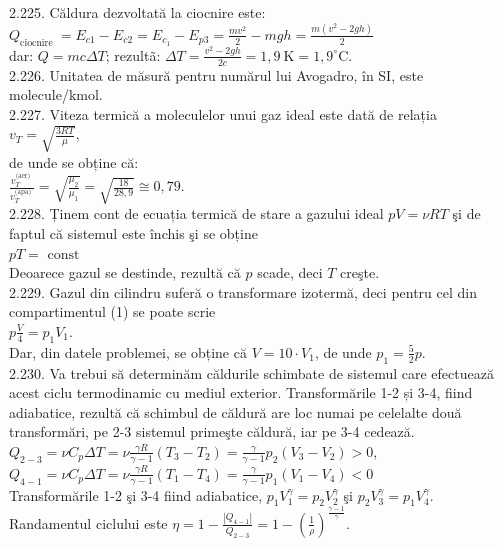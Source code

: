 2.225. Căldura dezvoltată la ciocnire este:\\ $Q_{\text {ciocnire }}=E_{c 1}-E_{c 2}=E_{c_{1}}-E_{p 3}=\frac{m v^{2}}{2}-m g h=\frac{m\left(v^{2}-2 g h\right)}{2}$\\ dar: $Q=m c \Delta T$; rezultã: $\Delta T=\frac{v^{2}-2 g h}{2 c}=1,9 \mathrm{~K}=1,9^{\circ} \mathrm{C}$.\\

2.226. Unitatea de măsură pentru numărul lui Avogadro, în SI, este molecule/kmol.\\

2.227. Viteza termică a moleculelor unui gaz ideal este dată de relația\\ $v_{T}=\sqrt{\frac{3 R T}{\mu}}$,\\ de unde se obține că:\\ $\frac{v_{T}^{\text {(aer) }}}{v_{T}^{\text {(apa) }}}=\sqrt{\frac{\mu_{2}}{\mu_{1}}}=\sqrt{\frac{18}{28,9}} \cong 0,79 .$\\

2.228. Ținem cont de ecuația termică de stare a gazului ideal $p V=\nu R T$ şi de faptul că sistemul este închis şi se obține\\ $p T=\text { const }$\\ Deoarece gazul se destinde, rezultă că $p$ scade, deci $T$ creşte.\\

2.229. Gazul din cilindru suferă o transformare izotermă, deci pentru cel din compartimentul (1) se poate scrie\\ $p \frac{V}{4}=p_{1} V_{1}$.\\

Dar, din datele problemei, se obține că $V=10 \cdot V_{1}$, de unde $p_{1}=\frac{5}{2} p$.\\

2.230. Va trebui să determinăm căldurile schimbate de sistemul care efectuează acest ciclu termodinamic cu mediul exterior. Transformările 1-2 și 3-4, fiind adiabatice, rezultă că schimbul de căldură are loc numai pe celelalte două transformări, pe 2-3 sistemul primeşte căldură, iar pe 3-4 cedează.\\ $Q_{2-3} =\nu C_{p} \Delta T=\nu \frac{\gamma R}{\gamma-1}\left(T_{3}-T_{2}\right)=\frac{\gamma}{\gamma-1} p_{2}\left(V_{3}-V_{2}\right)>0$,\\ $Q_{4-1} =\nu C_{p} \Delta T=\nu \frac{\gamma R}{\gamma-1}\left(T_{1}-T_{4}\right)=\frac{\gamma}{\gamma-1} p_{1}\left(V_{1}-V_{4}\right)<0$\\ Transformările 1-2 şi 3-4 fiind adiabatice, $p_{1} V_{1}^{\gamma}=p_{2} V_{2}^{\gamma}$ şi $p_{2} V_{3}^{\gamma}=p_{1} V_{4}^{\gamma}$.\\ Randamentul ciclului este $\eta=1-\frac{\left|Q_{4-1}\right|}{Q_{2-3}}=1-\left(\frac{1}{\rho}\right)^{\frac{\gamma-1}{\gamma}}$.\\

